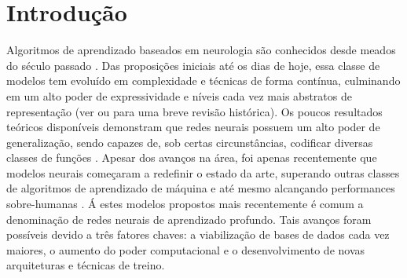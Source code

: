 \chapter{Introdução}

Algoritmos de aprendizado baseados em neurologia são conhecidos desde meados do século passado \cite{perceptron_58}. Das proposições iniciais até os dias de hoje, essa classe de modelos tem evoluído em complexidade e técnicas de forma contínua,
culminando em um alto poder de expressividade e níveis cada vez mais abstratos de representação (ver \cite{Goodfellow-et-al-2016} ou \cite{jurgenReview2015} para uma breve revisão histórica). Os poucos resultados teóricos disponíveis demonstram que redes neurais possuem um alto poder de generalização, sendo capazes de, sob certas circunstâncias, codificar diversas classes de funções \cite{Barron1993UniversalAB, Andoni2014PolyAprox}. Apesar dos avanços na área, foi apenas recentemente que modelos neurais começaram a redefinir o estado da arte, superando outras classes de algoritmos de aprendizado de máquina \cite{imagenet_2012} e até mesmo alcançando performances sobre-humanas \cite{mnih2015humanlevel}. Á estes modelos propostos mais recentemente é comum a denominação de redes neurais de aprendizado profundo. Tais avanços foram possíveis devido a três fatores chaves: a viabilização de bases de dados cada vez maiores, o aumento do poder computacional e o desenvolvimento de novas arquiteturas e técnicas de treino.

